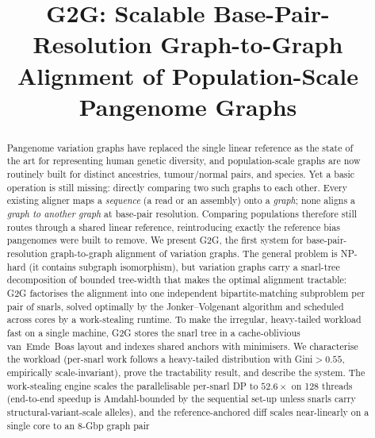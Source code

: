 \documentclass[conference]{IEEEtran}
\theoremstyle{plain}
\theoremstyle{definition}
\begin{document}
\title{G2G: Scalable Base-Pair-Resolution Graph-to-Graph
Alignment of Population-Scale Pangenome Graphs}

\author{%
%
}

\maketitle

\begin{abstract}
Pangenome variation graphs have replaced the single linear reference as the
state of the art for representing human genetic diversity, and population-scale
graphs are now routinely built for distinct ancestries, tumour/normal pairs,
and species. Yet a basic operation is still missing: directly comparing two
such graphs to each other. Every existing aligner maps a \emph{sequence} (a
read or an assembly) onto a \emph{graph}; none aligns a \emph{graph to another
graph} at base-pair resolution. Comparing populations therefore still routes
through a shared linear reference, reintroducing exactly the reference bias
pangenomes were built to remove. We present \textsc{G2G}, the first system for
base-pair-resolution graph-to-graph alignment of variation graphs. The general
problem is NP-hard (it contains subgraph isomorphism), but variation graphs
carry a snarl-tree decomposition of bounded tree-width that makes the optimal
alignment tractable: \textsc{G2G} factorises the alignment into one independent
bipartite-matching subproblem per pair of snarls, solved optimally by the
Jonker--Volgenant algorithm and scheduled across cores by a work-stealing
runtime. To make the irregular, heavy-tailed workload fast on a single
machine, \textsc{G2G} stores the snarl tree in a cache-oblivious van~Emde~Boas
layout and indexes shared anchors with minimisers. We characterise the workload
(per-snarl work follows a heavy-tailed distribution with Gini${>}0.55$,
empirically scale-invariant), prove the tractability result, and describe the
system. The work-stealing engine scales the parallelisable per-snarl DP to
$52.6\times$ on 128 threads (end-to-end speedup is Amdahl-bounded by the
sequential set-up unless snarls carry structural-variant-scale alleles), and the
reference-anchored diff
scales near-linearly on a single core to an 8-Gbp graph pair

\end{abstract}
\end{document}
